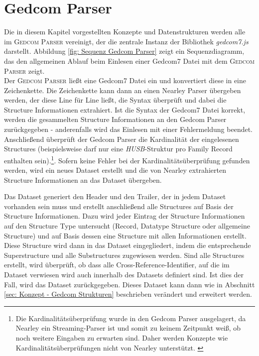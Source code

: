 \section{Gedcom Parser}
Die in diesem Kapitel vorgestellten Konzepte und Datenstrukturen werden alle im \textsc{Gedcom Parser} vereinigt, der die zentrale Instanz der Bibliothek \textit{gedcom7.js} darstellt. Abbildung \ref{fig: Sequenz Gedcom Parser} zeigt ein Sequenzdiagramm, das den allgemeinen Ablauf beim Einlesen einer Gedcom7 Datei mit dem \textsc{Gedcom Parser} zeigt.\\ 
Der \textsc{Gedcom Parser} ließt eine Gedcom7 Datei ein und konvertiert diese in eine Zeichenkette. Die Zeichenkette kann dann an einen Nearley Parser übergeben werden, der diese Line für Line ließt, die Syntax überprüft und dabei die Structure Informationen extrahiert. Ist die Syntax der Gedcom7 Datei korrekt, werden die gesammelten Structure Informationen an den Gedcom Parser zurückgegeben - anderenfalls wird das Einlesen mit einer Fehlermeldung beendet. Anschließend überprüft der Gedcom Parser die Kardinalität der eingelesenen Structures (beispielsweise darf nur eine \textit{HUSB}-Struktur pro Family Record enthalten sein).\footnote{Die Kardinalitätsüberprüfung wurde in den Gedcom Parser ausgelagert, da Nearley ein Streaming-Parser ist und somit zu keinem Zeitpunkt weiß, ob noch weitere Eingaben zu erwarten sind. Daher werden Konzepte wie Kardinalitätsüberprüfungen nicht von Nearley unterstützt. \cite{NearleyDoc}}. Sofern keine Fehler bei der Kardinalitätsüberprüfung gefunden werden, wird ein neues Dataset erstellt und die von Nearley extrahierten Structure Informationen an das Dataset übergeben. 


Das Dataset generiert den Header und den Trailer, der in jedem Dataset vorhanden sein muss und erstellt anschließend alle Structures auf Basis der Structure Informationen. Dazu wird jeder Eintrag der Structure Informationen auf den Structure Type untersucht (Record, Datatype Structure oder allgemeine Structure) und auf Basis dessen eine Structure mit allen Informationen erstellt. Diese Structure wird dann in das Dataset eingegliedert, indem die entsprechende Superstructure und alle Substructures zugewiesen werden. Sind alle Structures erstellt, wird überprüft, ob dass alle Cross-Reference-Identifier, auf die im Dataset verwiesen wird auch innerhalb des Datasets definiert sind. Ist dies der Fall, wird das Dataset zurückgegeben. Dieses Dataset kann dann wie in Abschnitt \ref{sec: Konzept - Gedcom Strukturen} beschrieben verändert und erweitert werden.

